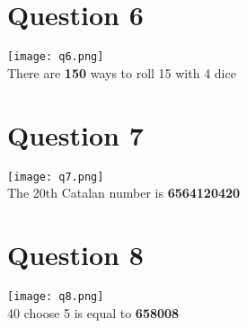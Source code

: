 \documentclass{article}
\begin{document}
\section{Question 6}
\begin{center}
	\texttt{[image: q6.png]} \\
	There are \textbf{150} ways to roll 15 with 4 dice
\end{center}

\section{Question 7}
\begin{center}
	\texttt{[image: q7.png]} \\
	The 20th Catalan number is \textbf{6564120420}
\end{center}

\section{Question 8}
\begin{center}
	\texttt{[image: q8.png]} \\
	40 choose 5 is equal to \textbf{658008}
\end{center}
	
	
\end{document}
